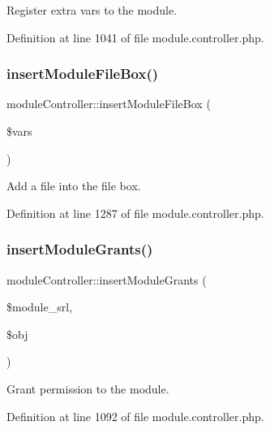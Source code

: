 Register extra vars to the module. 



Definition at line 1041 of file module.\+controller.\+php.

\hypertarget{classmoduleController_a141cdf2d372314e8661c276cdb8bd889}{}\label{classmoduleController_a141cdf2d372314e8661c276cdb8bd889} 
\subsubsection{\texorpdfstring{insert\+Module\+File\+Box()}{insertModuleFileBox()}}
{\footnotesize\ttfamily module\+Controller\+::insert\+Module\+File\+Box (\begin{DoxyParamCaption}\item[{}]{\$vars }\end{DoxyParamCaption})}



Add a file into the file box. 



Definition at line 1287 of file module.\+controller.\+php.

\hypertarget{classmoduleController_a551eda7765398673c806ca1def44c7ac}{}\label{classmoduleController_a551eda7765398673c806ca1def44c7ac} 
\subsubsection{\texorpdfstring{insert\+Module\+Grants()}{insertModuleGrants()}}
{\footnotesize\ttfamily module\+Controller\+::insert\+Module\+Grants (\begin{DoxyParamCaption}\item[{}]{\$module\+\_\+srl,  }\item[{}]{\$obj }\end{DoxyParamCaption})}



Grant permission to the module. 



Definition at line 1092 of file module.\+controller.\+php.

\hypertarget{classmoduleController_a6c7aab59734028d1c980053a75437a45}{}\label{classmoduleController_a6c7aab59734028d1c980053a75437a45} 
